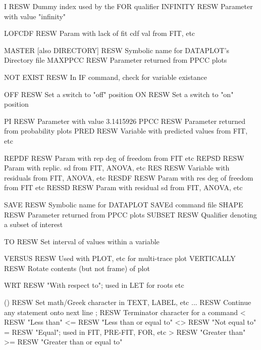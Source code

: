 I                           RESW  Dummy index used by the FOR qualifier
INFINITY                    RESW  Parameter with value "infinity"

LOFCDF                      RESW  Param with lack of fit cdf val from FIT, etc

MASTER [also DIRECTORY]     RESW  Symbolic name for DATAPLOT's Directory file
MAXPPCC                     RESW  Parameter returned from PPCC plots

NOT EXIST                   RESW  In IF command, check for variable existance

OFF                         RESW  Set a switch to "off" position
ON                          RESW  Set a switch to "on" position

PI                          RESW  Parameter with value 3.1415926
PPCC                        RESW  Parameter returned from probability plots
PRED                        RESW  Variable with predicted values from FIT, etc

REPDF                       RESW  Param with rep deg of freedom from FIT etc
REPSD                       RESW  Param with replic. sd from FIT, ANOVA, etc
RES                         RESW  Variable with residuals from FIT, ANOVA, etc
RESDF                       RESW  Param with res deg of freedom from FIT etc
RESSD                       RESW  Param with residual sd from FIT, ANOVA, etc

SAVE                        RESW  Symbolic name for DATAPLOT SAVEd command file
SHAPE                       RESW  Parameter returned from PPCC plots
SUBSET                      RESW  Qualifier denoting a subset of interest

TO                          RESW  Set interval of values within a variable

VERSUS                      RESW  Used with PLOT, etc for multi-trace plot
VERTICALLY                  RESW  Rotate contents (but not frame) of plot

WRT                         RESW  "With respect to"; used in LET for roots etc

()                          RESW  Set math/Greek character in TEXT, LABEL, etc
...                         RESW  Continue any statement onto next line
;                           RESW  Terminator character for a command
<                           RESW  "Less than"
<=                          RESW  "Less than or equal to"
<>                          RESW  "Not equal to"
=                           RESW  "Equal"; used in FIT, PRE-FIT, FOR, etc
>                           RESW  "Greater than"
>=                          RESW  "Greater than or equal to"


